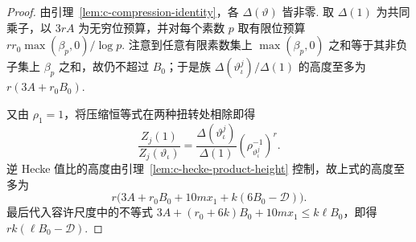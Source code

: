 \begin{proof}
由引理~\ref{lem:c-compression-identity}，各 $\Delta(\vartheta)$ 皆非零. 取 $\Delta(1)$ 为共同乘子，以 $3rA$ 为无穷位预算，并对每个素数 $p$ 取有限位预算 $rr_0\max(\beta_p,0)/\log p$. 注意到任意有限素数集上 $\max(\beta_p,0)$ 之和等于其非负子集上 $\beta_p$ 之和，故仍不超过 $B_0$；于是族 $\Delta(\vartheta_\iota^j)/\Delta(1)$ 的高度至多为 $r(3A+r_0 B_0)$.

又由 $\rho_1=1$，将压缩恒等式在两种扭转处相除即得
\[
 \frac{Z_j(1)}{Z_j(\vartheta_\iota)}
   =\frac{\Delta(\vartheta_\iota^j)}{\Delta(1)}
       \left(\rho_{\vartheta_\iota^j}^{-1}\right)^r .
\]
逆 Hecke 值比的高度由引理~\ref{lem:c-hecke-product-height} 控制，故上式的高度至多为
\[
 r\bigl(3A+r_0 B_0+10mx_1+k(6B_0-\mathcal D)\bigr).
\]
最后代入容许尺度中的不等式 $3A+(r_0+6k)B_0+10mx_1\le k\ell B_0$，即得 $rk(\ell B_0-\mathcal D)$.
\end{proof}

